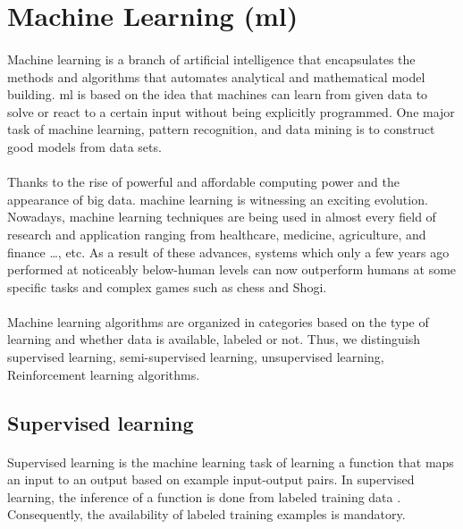 \section{Machine Learning (\acs{ml})}
\paragraph{}
Machine learning is a branch of artificial intelligence that encapsulates the methods and algorithms that automates analytical and mathematical model building. \acs{ml} is based on the idea that machines can learn from given data to solve or react to a certain input without being explicitly programmed\cite{ML:1}. One major task of machine learning, pattern recognition, and data mining is to construct good models from data sets.
\paragraph{}
Thanks to the rise of powerful and affordable computing power and the appearance of big data. machine learning is witnessing an exciting evolution. Nowadays, machine learning techniques are being used in almost every field of research and application ranging from healthcare, medicine, agriculture, and finance \dots, etc. As a result of these advances, systems which only a few years ago performed at noticeably below-human levels can now outperform humans at some specific tasks and complex games such as chess and Shogi\cite{DeepBlue,alphaZero}.
\paragraph{}
Machine learning algorithms are organized in categories based on the type of learning and whether data is available, labeled or not. Thus, we distinguish supervised learning, semi-supervised learning, unsupervised learning, Reinforcement learning algorithms.
\subsection{Supervised learning}
\paragraph{}
Supervised learning is the machine learning task of learning a function that maps an input to an output based on example input-output pairs\cite{ML:2}. In supervised learning, the inference of a function is done from labeled training data \cite{ML:3}. Consequently, the availability of labeled training examples is mandatory.
